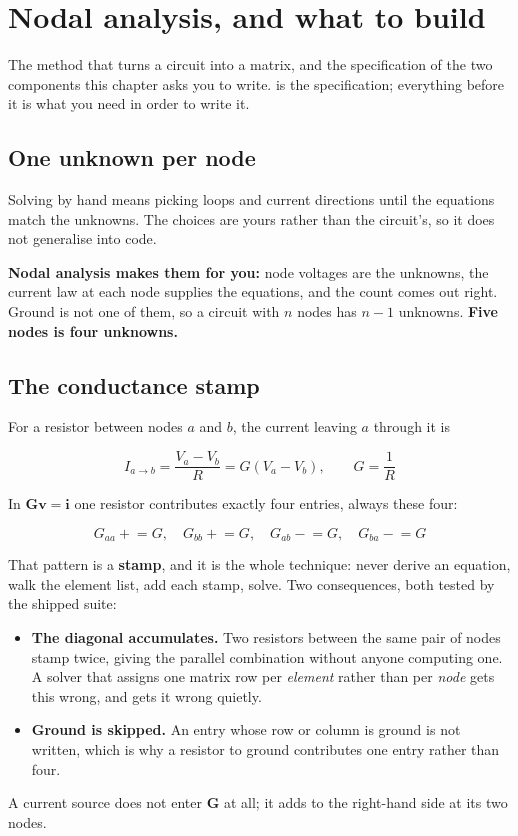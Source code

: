 
\section{Nodal analysis, and what to build}
\label{c1:app:b}

The method that turns a circuit into a matrix, and the specification of the two components this chapter asks you to write.  is the specification; everything before it is what you need in order to write it.

\subsection{One unknown per node}
\label{c1:sec:b1}
Solving by hand means picking loops and current directions until the equations match the unknowns. The choices are yours rather than the circuit's, so it does not generalise into code.

\textbf{Nodal analysis makes them for you:} node voltages are the unknowns, the current law at each node supplies the equations, and the count comes out right. Ground is not one of them, so a circuit with $n$ nodes has $n - 1$ unknowns. \textbf{Five nodes is four unknowns.}

\subsection{The conductance stamp}
\label{c1:sec:b2}
For a resistor between nodes $a$ and $b$, the current leaving $a$ through it is

\[
  I_{a \to b} = \frac{V_a - V_b}{R} = G(V_a - V_b), \qquad G = \frac{1}{R}
\]

In $\mathbf{G}\mathbf{v} = \mathbf{i}$ one resistor contributes exactly four entries, always these four:

\[
  G_{aa} \mathrel{+}= G, \quad G_{bb} \mathrel{+}= G, \quad G_{ab} \mathrel{-}= G, \quad G_{ba} \mathrel{-}= G
\]

That pattern is a \textbf{stamp}, and it is the whole technique: never derive an equation, walk the element list, add each stamp, solve. Two consequences, both tested by the shipped suite:

\begin{itemize}
  \item \textbf{The diagonal accumulates.} Two resistors between the same pair of nodes stamp twice, giving the parallel combination without anyone computing one. A solver that assigns one matrix row per \emph{element} rather than per \emph{node} gets this wrong, and gets it wrong quietly.
  \item \textbf{Ground is skipped.} An entry whose row or column is ground is not written, which is why a resistor to ground contributes one entry rather than four.
\end{itemize}
A current source does not enter $\mathbf{G}$ at all; it adds to the right-hand side at its two nodes.

